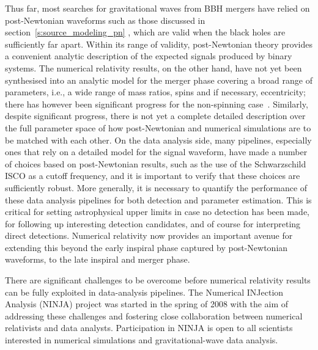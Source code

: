 \newcommand{\Ytwo}{{{}^{-2}Y}}

\newcommand\T{}
\newcommand\B{}
\newcommand\TT{}
\newcommand\BB{}
\newcommand\TTT{}



Thus far, most searches for gravitational waves from BBH mergers have
relied on post-Newtonian waveforms such as those discussed in
section~\ref{s:source_modeling_pn} , which are valid when the black
holes are sufficiently far apart.  Within its range of validity,
post-Newtonian theory provides a convenient analytic description of
the expected signals produced by binary systems.  The numerical
relativity results, on the other hand, have not yet been synthesised
into an analytic model for the merger phase covering a broad range of
parameters, i.e., a wide range of mass ratios, spins and if necessary,
eccentricity; there has however been significant progress for the
non-spinning
case~\cite{Buonanno:2006ui,Berti:2007fi,Ajith:2007kx,Pan:2007nw,%
Buonanno:2007pf,Boyle:2007ft,%
Ajith:2007qp,Damour:2007yf,Damour:2007vq,Damour:2008te,Boyle:2008ge,Boyle:2009dg}.
Similarly, despite significant progress, there is not yet a complete
detailed description over the full parameter space of how
post-Newtonian and numerical simulations are to be matched with each
other.  On the data analysis side, many pipelines, especially ones
that rely on a detailed model for the signal waveform, have made a
number of choices based on post-Newtonian results, such as the use of
the Schwarzschild ISCO as a cutoff frequency, and it is important to
verify that these choices are sufficiently robust.  More generally, it
is necessary to quantify the performance of these data analysis
pipelines for both detection and parameter estimation.  This is
critical for setting astrophysical upper limits in case no detection
has been made, for following up interesting detection candidates, and
of course for interpreting direct detections.  Numerical relativity
now provides an important avenue for extending this beyond the early
inspiral phase captured by post-Newtonian waveforms, to the late
inspiral and merger phase.  

There are significant challenges to be overcome before numerical
relativity results can be fully exploited in data-analysis pipelines.
The Numerical INJection Analysis (NINJA) project was started in the
spring of 2008 with the aim of addressing these challenges and
fostering close collaboration between numerical relativists and data
analysts. Participation in NINJA is open to all scientists interested
in numerical simulations and gravitational-wave data analysis.  

